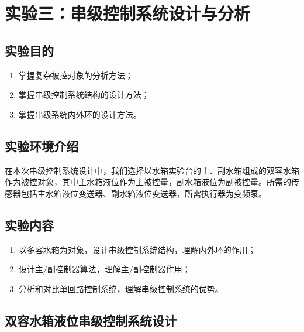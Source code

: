 \documentclass[UTF8]{article}
\begin{document}



\newpage
%
\section{实验三：串级控制系统设计与分析}
\subsection{实验目的}
\begin{enumerate}
	\item 掌握复杂被控对象的分析方法；
	\item 掌握串级控制系统结构的设计方法；
	\item 掌握串级系统内外环的设计方法。
\end{enumerate}

\subsection{实验环境介绍}

在本次串级控制系统设计中，我们选择以水箱实验台的主、副水箱组成的双容水箱作为被控对象，其中主水箱液位作为主被控量，副水箱液位为副被控量。所需的传感器包括主水箱液位变送器、副水箱液位变送器，所需执行器为变频泵。

\subsection{实验内容}
\begin{enumerate}
	\item 以多容水箱为对象，设计串级控制系统结构，理解内外环的作用；
	\item 设计主/副控制器算法，理解主/副控制器作用；
	\item 分析和对比单回路控制系统，理解串级控制系统的优势。
\end{enumerate}

\subsection{双容水箱液位串级控制系统设计}
\end{document}

